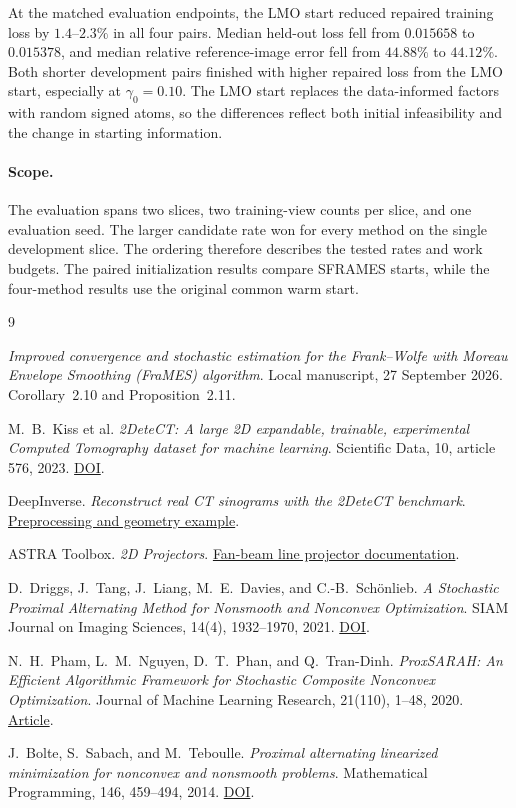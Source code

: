 \documentclass[11pt]{article}
\begin{document}
At the matched evaluation endpoints, the LMO start reduced repaired
training loss by \(1.4\)--\(2.3\%\) in all four pairs. Median held-out
loss fell from \(0.015658\) to \(0.015378\), and median relative
reference-image error fell from \(44.88\%\) to \(44.12\%\). Both shorter
development pairs finished with higher repaired loss from the LMO start,
especially at \(\gamma_0=0.10\). The LMO start replaces the
data-informed factors with random signed atoms, so the differences reflect
both initial infeasibility and the change in starting information.

\paragraph{Scope.}
The evaluation spans two slices, two training-view counts per slice, and
one evaluation seed. The larger candidate rate won for every method on the
single development slice. The ordering therefore describes the tested
rates and work budgets. The paired initialization results compare SFRAMES
starts, while the four-method results use the original common warm start.

\begin{thebibliography}{9}

\emph{Improved convergence and stochastic estimation for the Frank--Wolfe with
Moreau Envelope Smoothing (FraMES) algorithm}.
Local manuscript, 27 September 2026. Corollary~2.10 and Proposition~2.11.

M.~B.~Kiss et al.
\emph{2DeteCT: A large 2D expandable, trainable, experimental Computed Tomography
dataset for machine learning}.
Scientific Data, 10, article 576, 2023.
\href{https://doi.org/10.1038/s41597-023-02484-6}{DOI}.

DeepInverse.
\emph{Reconstruct real CT sinograms with the 2DeteCT benchmark}.
\href{https://deepinv.org/auto_examples/external-libraries/demo_astra_2detect.html}{Preprocessing and geometry example}.

ASTRA Toolbox.
\emph{2D Projectors}.
\href{https://astra-toolbox.com/docs/proj2d.html#fan-beam}{Fan-beam line projector documentation}.

D.~Driggs, J.~Tang, J.~Liang, M.~E.~Davies, and C.-B.~Sch\"onlieb.
\emph{A Stochastic Proximal Alternating Method for Nonsmooth and Nonconvex Optimization}.
SIAM Journal on Imaging Sciences, 14(4), 1932--1970, 2021.
\href{https://doi.org/10.1137/20M1387213}{DOI}.

N.~H.~Pham, L.~M.~Nguyen, D.~T.~Phan, and Q.~Tran-Dinh.
\emph{ProxSARAH: An Efficient Algorithmic Framework for Stochastic Composite
Nonconvex Optimization}.
Journal of Machine Learning Research, 21(110), 1--48, 2020.
\href{https://www.jmlr.org/papers/v21/19-248.html}{Article}.

J.~Bolte, S.~Sabach, and M.~Teboulle.
\emph{Proximal alternating linearized minimization for nonconvex and nonsmooth problems}.
Mathematical Programming, 146, 459--494, 2014.
\href{https://doi.org/10.1007/s10107-013-0701-9}{DOI}.

\end{thebibliography}
\end{document}
